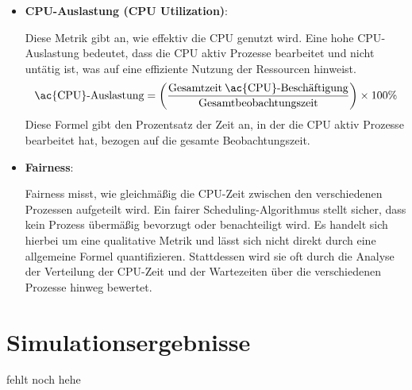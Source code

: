 \begin{itemize}
	\item \textbf{\ac{CPU}-Auslastung (\ac{CPU} Utilization)}: 
	
	Diese Metrik gibt an, wie effektiv die \ac{CPU} genutzt wird. Eine hohe \ac{CPU}-Auslastung bedeutet, dass die \ac{CPU} aktiv Prozesse bearbeitet und nicht untätig ist, was auf eine effiziente Nutzung der Ressourcen hinweist.
	\[ \text{\ac{CPU}-Auslastung} = \left( \frac{\text{Gesamtzeit\:\ac{CPU}-Beschäftigung}}{\text{Gesamtbeobachtungszeit}} \right) \times 100\% \]
	Diese Formel gibt den Prozentsatz der Zeit an, in der die CPU aktiv Prozesse bearbeitet hat, bezogen auf die gesamte Beobachtungszeit.
	
	\item \textbf{Fairness}: 
	
	Fairness misst, wie gleichmäßig die \ac{CPU}-Zeit zwischen den verschiedenen Prozessen aufgeteilt wird. Ein fairer Scheduling-Algorithmus stellt sicher, dass kein Prozess übermäßig bevorzugt oder benachteiligt wird. Es handelt sich hierbei um eine qualitative Metrik und lässt sich nicht direkt durch eine allgemeine Formel quantifizieren. Stattdessen wird sie oft durch die Analyse der Verteilung der \ac{CPU}-Zeit und der Wartezeiten über die verschiedenen Prozesse hinweg bewertet.
\end{itemize}


\section{Simulationsergebnisse}
fehlt noch hehe

